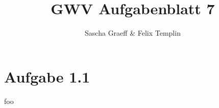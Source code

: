 \documentclass[a4paper,10pt]{article}
\title{GWV Aufgabenblatt 7}
\author{Sascha Graeff \& Felix Templin}
\begin{document}
\maketitle

\section*{Aufgabe 1.1}
foo
\end{document}
